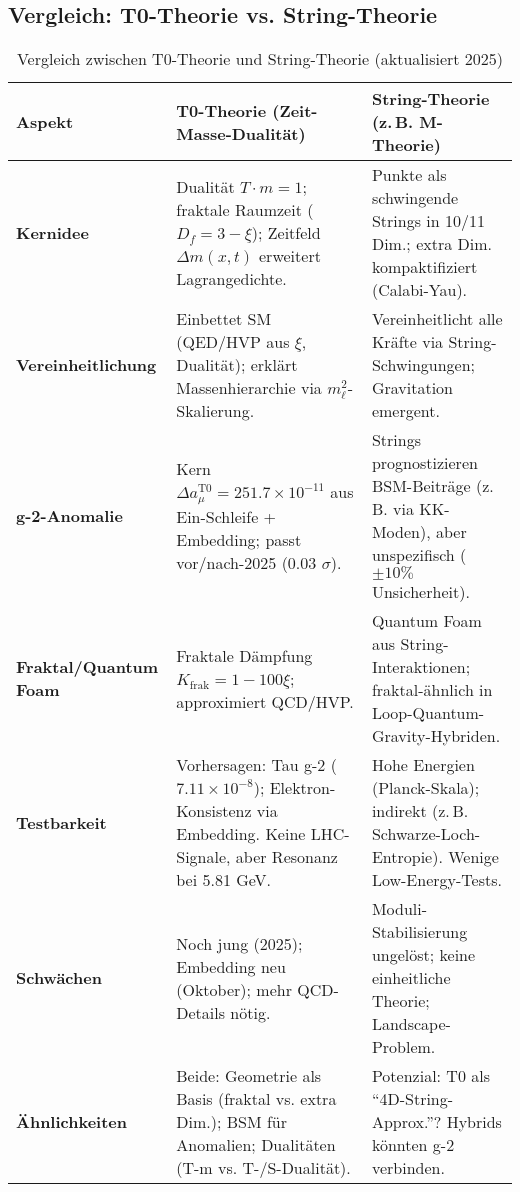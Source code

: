 \documentclass[12pt,a4paper]{article}
\begin{document}
	\subsection{Vergleich: T0-Theorie vs. String-Theorie}
	
	\begin{table}[ht]
		\centering
		\begin{tabular}{|p{4cm}|p{5cm}|p{5cm}|}
			\hline
			\textbf{Aspekt} & \textbf{T0-Theorie (Zeit-Masse-Dualität)} & \textbf{String-Theorie (z.\,B. M-Theorie)} \\
			\hline
			\textbf{Kernidee} & Dualität $T \cdot m = 1$; fraktale Raumzeit ($D_f = 3 - \xi$); Zeitfeld $\Delta m(x,t)$ erweitert Lagrangedichte. & Punkte als schwingende Strings in 10/11 Dim.; extra Dim. kompaktifiziert (Calabi-Yau). \\
			\hline
			\textbf{Vereinheitlichung} & Einbettet SM (QED/HVP aus $\xi$, Dualität); erklärt Massenhierarchie via $m_\ell^2$-Skalierung. & Vereinheitlicht alle Kräfte via String-Schwingungen; Gravitation emergent. \\
			\hline
			\textbf{g-2-Anomalie} & Kern $\Delta a_\mu^\text{T0} = 251.7 \times 10^{-11}$ aus Ein-Schleife + Embedding; passt vor/nach-2025 (0.03 $\sigma$). & Strings prognostizieren BSM-Beiträge (z.\,B. via KK-Moden), aber unspezifisch ($\pm 10\%$ Unsicherheit). \\
			\hline
			\textbf{Fraktal/Quantum Foam} & Fraktale Dämpfung $K_\text{frak} = 1 - 100\xi$; approximiert QCD/HVP. & Quantum Foam aus String-Interaktionen; fraktal-ähnlich in Loop-Quantum-Gravity-Hybriden. \\
			\hline
			\textbf{Testbarkeit} & Vorhersagen: Tau g-2 ($7.11 \times 10^{-8}$); Elektron-Konsistenz via Embedding. Keine LHC-Signale, aber Resonanz bei 5.81 GeV. & Hohe Energien (Planck-Skala); indirekt (z.\,B. Schwarze-Loch-Entropie). Wenige Low-Energy-Tests. \\
			\hline
			\textbf{Schwächen} & Noch jung (2025); Embedding neu (Oktober); mehr QCD-Details nötig. & Moduli-Stabilisierung ungelöst; keine einheitliche Theorie; Landscape-Problem. \\
			\hline
			\textbf{Ähnlichkeiten} & Beide: Geometrie als Basis (fraktal vs. extra Dim.); BSM für Anomalien; Dualitäten (T-m vs. T-/S-Dualität). & Potenzial: T0 als ``4D-String-Approx.''? Hybrids könnten g-2 verbinden. \\
			\hline
		\end{tabular}
		\caption{Vergleich zwischen T0-Theorie und String-Theorie (aktualisiert 2025)}
		\label{tab:string_comparison}
	\end{table}
	
\end{document}
